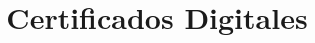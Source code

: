 
\newcommand{\authorG}{Correa Fernández, Gema \hspace{0.3cm} 75572158-T \\ \href{mailto:gecorrea@correo.ugr.es}{\textcolor{blue}{\underline{gecorrea@correo.ugr.es}}}}

\title{Certificados Digitales}
\newcommand{\subtitulo}{\textsc{DNI Electrónico}}
\newcommand{\nombrecurso}{Administración de Sistemas y Seguridad}